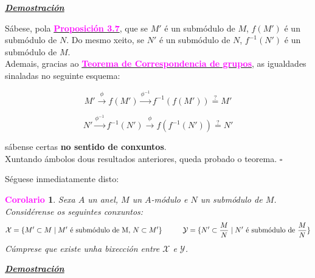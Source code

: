 \documentclass[twoside]{report}
\newcommand{\magbf}[1]{\textcolor{magenta}{\textbf{#1}}} %
\theoremstyle{mystyle}
\newtheorem{cor}{\magbf{Corolario}}[chapter]
\newenvironment{corollary}
{\begin{mdframed}[linecolor = magenta,backgroundcolor = classicrose, linewidth = 2mm]\begin{cor}}
{\end{cor}\end{mdframed}}
\begin{document}
\vspace{2mm}

\noindent \textbf{\textit{\underline{Demostración}}}

\vspace{2mm}

\noindent Sábese, pola \hyperref[prop3.7]{\magbf{Proposición 3.7}}, que se $M'$ é un submódulo de $M$, $f(M')$ é un submódulo de $N$. Do mesmo xeito, se $N'$ é un submódulo de $N$, $f^{-1}(N')$ é un submódulo de $M$.\\

\noindent Ademais, gracias ao \hyperref[th1.8]{\magbf{Teorema de Correspondencia de grupos}}, as igualdades sinaladas no seguinte esquema:

$$ M' \overset{\phi}{\longrightarrow} f(M') \overset{\phi^{-1}}{\longrightarrow} f^{-1}(f(M')) \overset{?}{=} M' $$

$$ N' \overset{\phi^{-1}}{\longrightarrow} f^{-1}(N') \overset{\phi}{\longrightarrow} f(f^{-1}(N')) \overset{?}{=} N'$$

\noindent sábense certas \textbf{no sentido de conxuntos}.\\

\noindent Xuntando ámbolos dous resultados anteriores, queda probado o teorema. $\square$\\

\vspace{3mm}

\noindent Séguese inmediatamente disto:

\begin{corollary} \label{cor3.2}
Sexa $A$ un anel, $M$ un $A$-módulo e $N$ un submódulo de $M$. Considérense os seguintes conxuntos:
$$\mathcal{X} = \{M' \subset M \hspace{1mm} | \hspace{1mm} M' \text{ é submódulo de M, } N \subset M'\} \hspace{10mm} \mathcal{Y}= \{ N' \subset \displaystyle \frac{M}{N} \hspace{1mm} | \hspace{1mm} N' \text{ é submódulo de } \displaystyle \frac{M}{N}\}$$
\noindent Cúmprese que existe unha bixección entre $\mathcal{X}$ e $\mathcal{Y}$.
\end{corollary}

\vspace{2mm}

\noindent \textbf{\textit{\underline{Demostración}}}

\vspace{2mm}
\end{document}
